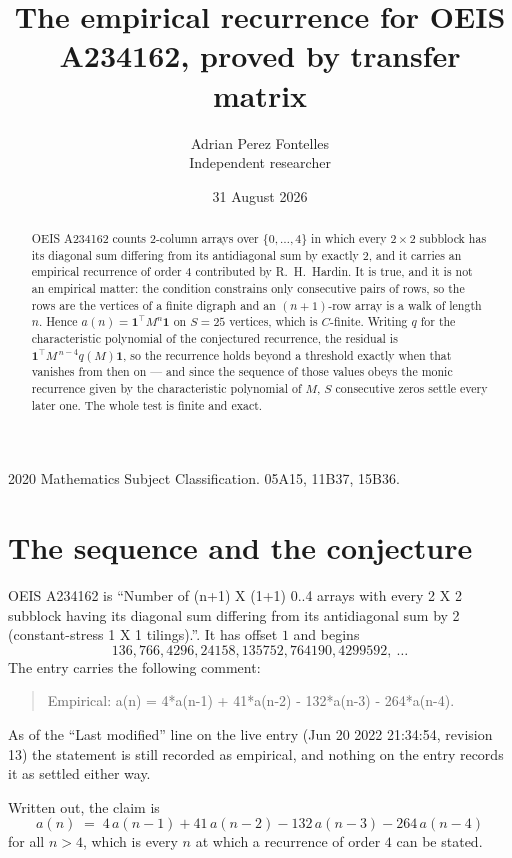 \documentclass[11pt,a4paper]{article}
\title{The empirical recurrence for OEIS A234162, proved by transfer matrix}
\author{Adrian Perez Fontelles\\ \small Independent researcher}
\date{31 August 2026}
\theoremstyle{plain}
\theoremstyle{definition}
\begin{document}
\maketitle

\begin{abstract}
OEIS A234162 counts $2$-column arrays over $\{0,\dots,4\}$ in which every
$2\times2$ subblock has its diagonal sum differing from its antidiagonal sum by
exactly $2$, and it
carries an empirical recurrence of order $4$ contributed by R.~H.~Hardin. It is true,
and it is not an empirical matter: the condition constrains only consecutive pairs of rows,
so the rows are the vertices of a finite digraph and an $(n+1)$-row array is a walk of
length $n$. Hence $a(n)=\mathbf{1}^{\!\top}M^{n}\mathbf{1}$ on $S=25$ vertices, which
is $C$-finite. Writing $q$ for the characteristic polynomial of the conjectured recurrence,
the residual is $\mathbf{1}^{\!\top}M^{\,n-4}q(M)\mathbf{1}$, so the recurrence
holds beyond a threshold exactly when that vanishes from then on --- and since the sequence
of those values obeys the monic recurrence given by the characteristic polynomial of $M$,
$S$ consecutive zeros settle every later one. The whole test is finite and exact.
\end{abstract}

\noindent\small 2020 Mathematics Subject Classification. 05A15, 11B37, 15B36.\normalsize

\section{The sequence and the conjecture}

OEIS A234162 is ``Number of (n+1) X (1+1) 0..4 arrays with every 2 X 2 subblock having its diagonal sum differing from its antidiagonal sum by 2 (constant-stress 1 X 1 tilings).''. It has offset
$1$ and begins
\[
136, 766, 4296, 24158, 135752, 764190, 4299592,\ \dots
\]
The entry carries the following comment:
\begin{quote}\small
Empirical: a(n) = 4*a(n-1) + 41*a(n-2) - 132*a(n-3) - 264*a(n-4).
\end{quote}
As of the ``Last modified'' line on the live entry (Jun 20 2022 21:34:54, revision 13) the statement is
still recorded as empirical, and nothing on the entry records it as settled either way.

Written out, the claim is
\begin{equation}\label{eq:conj}
a(n)\;=\;4\,a(n-1) + 41\,a(n-2) - 132\,a(n-3) - 264\,a(n-4)
\end{equation}
for all $n>4$, which is every $n$ at which a recurrence of order $4$ can be
stated.
\end{document}
